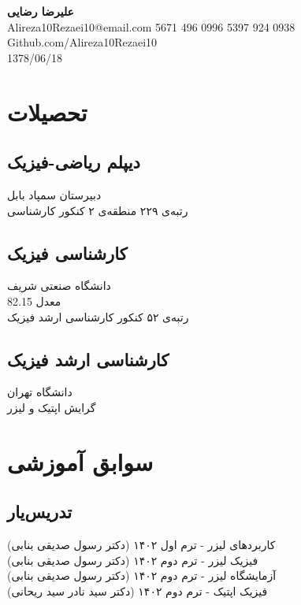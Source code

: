 \documentclass{persian-resume}
\begin{document}
\begin{center}
  {\Huge \textbf{
    علیرضا رضایی
  }} \\
  \vspace{1.5em}
  Alireza10Rezaei10@email.com \hspace{1cm} 5671 496 0996 \hspace{1cm} 5397 924 0938\\
  \vspace{1em}
  Github.com/Alireza10Rezaei10\\
  \vspace{1em}
    1378/06/18
\end{center}

\section{تحصیلات}
\subsection*{دیپلم ریاضی-فیزیک}
دبیرستان سمپاد بابل\\
رتبه‌ی ۲۲۹ منطقه‌ی ۲ کنکور کارشناسی

\subsection*{
کارشناسی فیزیک
}
دانشگاه صنعتی شریف\\
معدل 82.15\\
رتبه‌ی ۵۲ کنکور کارشناسی ارشد فیزیک

\subsection*{
کارشناسی ارشد فیزیک
}
دانشگاه تهران\\
گرایش اپتیک و لیزر

\section{
    سوابق آموزشی
}
\subsection*{
تدریس‌یار
}
کاربردهای لیزر - ترم اول ۱۴۰۲ (دکتر رسول صدیقی بنابی)\\
فیزیک لیزر - ترم دوم ۱۴۰۲ (دکتر رسول صدیقی بنابی)\\
آزمایشگاه لیزر - ترم دوم ۱۴۰۲ (دکتر رسول صدیقی بنابی)\\
فیزیک اپتیک - ترم دوم ۱۴۰۲ (دکتر سید نادر سید ریحانی)
\end{document}

